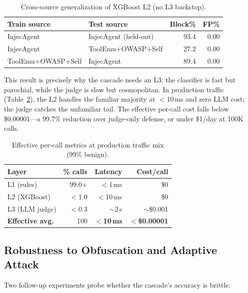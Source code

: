\documentclass{article}
\begin{document}
\begin{table}[t]
\centering\small
\caption{Cross-source generalization of XGBoost L2 (no L3 backstop).}
\vspace{-0.1in}
\label{tab:xsource}
\begin{tabular}{llrr}
\toprule
Train source & Test source & Block\% & FP\% \\
\midrule
InjecAgent & InjecAgent (held-out) & 93.4 & 0.00 \\
InjecAgent & ToolEmu+OWASP+Self & 27.2 & 0.00 \\
ToolEmu+OWASP+Self & InjecAgent & 89.4 & 0.00 \\
\bottomrule
\end{tabular}
\vspace{-0.1in}
\end{table}

This result is precisely why the cascade needs an L3: the classifier is fast but parochial, while the judge is slow but cosmopolitan.
In production traffic (Table~\ref{tab:production}), the L2 handles the familiar majority at $<$10\,ms and zero LLM cost; the judge catches the unfamiliar tail.
The effective per-call cost falls below \$0.00001---a 99.7\% reduction over judge-only defense, or under \$1/day at 100K calls.

\begin{table}[t]
\centering\small
\caption{Effective per-call metrics at production traffic mix (99\% benign).}
\vspace{-0.1in}
\label{tab:production}
\begin{tabular}{lrrr}
\toprule
Layer & \% calls & Latency & Cost/call \\
\midrule
L1 (rules) & 99.0+ & $<$1\,ms & \$0 \\
L2 (XGBoost) & $<$1.0 & $<$10\,ms & \$0 \\
L3 (LLM judge) & $<$0.3 & $\sim$2\,s & $\sim$\$0.001 \\
\midrule
\textbf{Effective avg.} & 100 & $<$\textbf{10\,ms} & $<$\textbf{\$0.00001} \\
\bottomrule
\end{tabular}
\vspace{-0.1in}
\end{table}

\subsection{Robustness to Obfuscation and Adaptive Attack}

Two follow-up experiments probe whether the cascade's accuracy is brittle.
\end{document}
